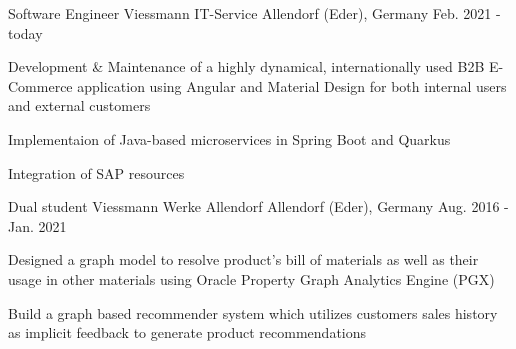 

\begin{cventries}

  \cventry
    {Software Engineer} %
    {Viessmann IT-Service} %
    {Allendorf (Eder), Germany} %
    {Feb. 2021 - today} %
    {
      \begin{cvitems} %
        \item {Development \& Maintenance of a highly dynamical, internationally used B2B E-Commerce application using Angular and Material Design for both internal users and external customers}
        \item {Implementaion of Java-based microservices in Spring Boot and Quarkus}
        \item {Integration of SAP resources}
      \end{cvitems}
    }

    \cventry
    {Dual student} %
    {Viessmann Werke Allendorf} %
    {Allendorf (Eder), Germany} %
    {Aug. 2016 - Jan. 2021} %
    {
        \begin{cvitems} %
            \item {Designed a graph model to resolve product's bill of materials as well as their usage in other materials using Oracle Property Graph Analytics Engine (PGX)}
            \item {Build a graph based recommender system which utilizes customers sales history as implicit feedback to generate product recommendations}
        \end{cvitems}
    }

\end{cventries}
